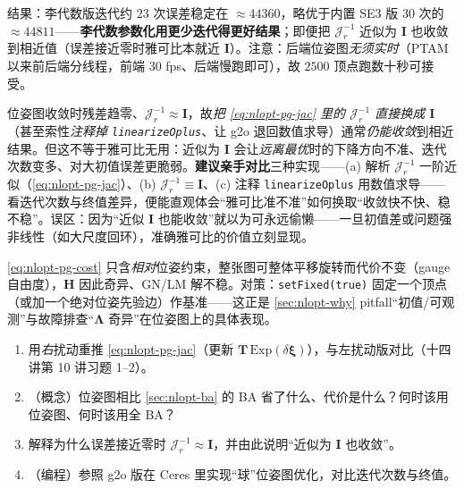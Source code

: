 \noindent 结果：李代数版迭代约 $23$ 次误差稳定在 $\approx44360$，略优于内置 SE3 版 $30$ 次的 $\approx44811$——\textbf{李代数参数化用更少迭代得更好结果}；即便把 $\mathcal{J}_r^{-1}$ 近似为 $\mathbf{I}$ 也收敛到相近值（误差接近零时雅可比本就近 $\mathbf{I}$）。注意：后端位姿图\emph{无须实时}（PTAM 以来前后端分线程，前端 $30$ fps、后端慢跑即可），故 $2500$ 顶点跑数十秒可接受。

\begin{pitfall}
位姿图收敛时残差趋零、$\mathcal{J}_r^{-1}\approx\mathbf{I}$，故\emph{把 \cref{eq:nlopt-pg-jac} 里的 $\mathcal{J}_r^{-1}$ 直接换成 $\mathbf{I}$}（甚至索性\emph{注释掉 \texttt{linearizeOplus}}、让 g2o 退回数值求导）通常\emph{仍能收敛}到相近结果。但这不等于雅可比无用：近似为 $\mathbf{I}$ 会让\emph{远离最优}时的下降方向不准、迭代次数变多、对大初值误差更脆弱。\textbf{建议亲手对比}三种实现——(a) 解析 $\mathcal{J}_r^{-1}$ 一阶近似（\cref{eq:nlopt-pg-jac}）、(b) $\mathcal{J}_r^{-1}\equiv\mathbf{I}$、(c) 注释 \texttt{linearizeOplus} 用数值求导——看迭代次数与终值差异，便能直观体会“雅可比准不准”如何换取“收敛快不快、稳不稳”\cite{gaoxiang2019slam14}。误区：因为“近似 $\mathbf{I}$ 也能收敛”就以为可永远偷懒——一旦初值差或问题强非线性（如大尺度回环），准确雅可比的价值立刻显现。
\end{pitfall}

\begin{pitfall}
\cref{eq:nlopt-pg-cost} 只含\emph{相对}位姿约束，整张图可整体平移旋转而代价不变（gauge 自由度），$\mathbf{H}$ 因此奇异、GN/LM 解不稳。对策：\texttt{setFixed(true)} 固定一个顶点（或加一个绝对位姿先验边）作基准——这正是 \cref{sec:nlopt-why} pitfall“初值/可观测”与故障排查“$\boldsymbol{\Lambda}$ 奇异”在位姿图上的具体表现。
\end{pitfall}

\begin{practice}
\begin{enumerate}
  \item 用\emph{右}扰动重推 \cref{eq:nlopt-pg-jac}（更新 $\mathbf{T}\,\mathrm{Exp}(\delta\boldsymbol{\xi})$），与左扰动版对比（十四讲第 10 讲习题 1--2）。
  \item （概念）位姿图相比 \cref{sec:nlopt-ba} 的 BA 省了什么、代价是什么？何时该用位姿图、何时该用全 BA？
  \item 解释为什么误差接近零时 $\mathcal{J}_r^{-1}\approx\mathbf{I}$，并由此说明“近似为 $\mathbf{I}$ 也收敛”。
  \item （编程）参照 g2o 版在 Ceres 里实现“球”位姿图优化，对比迭代次数与终值。
\end{enumerate}
\end{practice}

